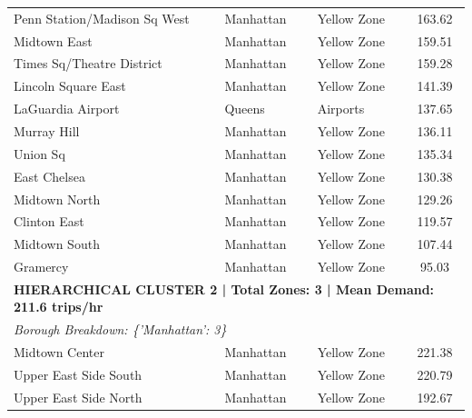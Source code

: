 \documentclass[11pt,a4paper]{article}
\begin{document}
\begin{table}[htbp]
\begin{tabular}{lllc}
        \midrule
        Penn Station/Madison Sq West & Manhattan & Yellow Zone & 163.62 \\
        Midtown East & Manhattan & Yellow Zone & 159.51 \\
        Times Sq/Theatre District & Manhattan & Yellow Zone & 159.28 \\
        Lincoln Square East & Manhattan & Yellow Zone & 141.39 \\
        LaGuardia Airport & Queens & Airports & 137.65 \\
        Murray Hill & Manhattan & Yellow Zone & 136.11 \\
        Union Sq & Manhattan & Yellow Zone & 135.34 \\
        East Chelsea & Manhattan & Yellow Zone & 130.38 \\
        Midtown North & Manhattan & Yellow Zone & 129.26 \\
        Clinton East & Manhattan & Yellow Zone & 119.57 \\
        Midtown South & Manhattan & Yellow Zone & 107.44 \\
        Gramercy & Manhattan & Yellow Zone & 95.03 \\
        \midrule
        \multicolumn{4}{l}{\textbf{HIERARCHICAL CLUSTER 2 | Total Zones: 3 | Mean Demand: 211.6 trips/hr}} \\
        \multicolumn{4}{l}{\textit{Borough Breakdown: \{'Manhattan': 3\}}} \\
        \midrule
        Midtown Center & Manhattan & Yellow Zone & 221.38 \\
        Upper East Side South & Manhattan & Yellow Zone & 220.79 \\
        Upper East Side North & Manhattan & Yellow Zone & 192.67 \\
        \bottomrule
    \end{tabular}
\end{table}
\end{document}
